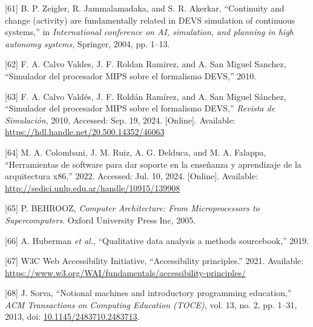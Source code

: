 \documentclass[12pt,oneside]{templates/unerthesis}
\newcommand{\CSLLeftMargin}[1]{#1} %
\newcommand{\CSLRightInline}[1]{#1} %
\newlength{\cslhangindent}
\newenvironment{CSLReferences}[2] %
 {\setlength{\parindent}{0pt}%
  \setlength{\leftskip}{#1 pt\relax}%
  \setlength{\parskip}{#2 pt\relax}%
  \everypar{\setlength{\hangindent}{\cslhangindent}}}
 {\par}
\begin{document}
\begin{CSLReferences}{0}{0}
\leavevmode{}%
\CSLLeftMargin{{[}61{]} }%
\CSLRightInline{B. P. Zeigler, R. Jammalamadaka, and S. R. Akerkar, {``Continuity and change (activity) are fundamentally related in DEVS simulation of continuous systems,''} in \emph{International conference on AI, simulation, and planning in high autonomy systems}, Springer, 2004, pp. 1--13.}

\leavevmode{}%
\CSLLeftMargin{{[}62{]} }%
\CSLRightInline{F. A. Calvo Valdes, J. F. Roldan Ramirez, and A. San Miguel Sanchez, {``Simulador del procesador MIPS sobre el formalismo DEVS,''} 2010.}

\leavevmode{}%
\CSLLeftMargin{{[}63{]} }%
\CSLRightInline{F. A. Calvo Valdés, J. F. Roldán Ramírez, and A. San Miguel Sánchez, {``Simulador del procesador {MIPS} sobre el formalismo {DEVS},''} \emph{Revista de Simulación}, 2010, Accessed: Sep. 19, 2024. {[}Online{]}. Available: \url{https://hdl.handle.net/20.500.14352/46063}}

\leavevmode{}%
\CSLLeftMargin{{[}64{]} }%
\CSLRightInline{M. A. Colombani, J. M. Ruiz, A. G. Delduca, and M. A. Falappa, {``Herramientas de software para dar soporte en la enseñanza y aprendizaje de la arquitectura x86,''} 2022. Accessed: Jul. 10, 2024. {[}Online{]}. Available: \url{http://sedici.unlp.edu.ar/handle/10915/139908}}

\leavevmode{}%
\CSLLeftMargin{{[}65{]} }%
\CSLRightInline{P. BEHROOZ, \emph{Computer {Architecture}: {From} {Microprocessors} to {Supercomputers}}. Oxford University Press Inc, 2005.}

\leavevmode{}%
\CSLLeftMargin{{[}66{]} }%
\CSLRightInline{A. Huberman \emph{et al.}, {``Qualitative data analysis a methods sourcebook,''} 2019.}

\leavevmode{}%
\CSLLeftMargin{{[}67{]} }%
\CSLRightInline{W3C Web Accessibility Initiative, {``Accessibility principles.''} 2021. Available: \url{https://www.w3.org/WAI/fundamentals/accessibility-principles/}}

\leavevmode{}%
\CSLLeftMargin{{[}68{]} }%
\CSLRightInline{J. Sorva, {``Notional machines and introductory programming education,''} \emph{ACM Transactions on Computing Education (TOCE)}, vol. 13, no. 2, pp. 1--31, 2013, doi: \href{https://doi.org/10.1145/2483710.2483713}{10.1145/2483710.2483713}.}


\end{CSLReferences}
\end{document}
